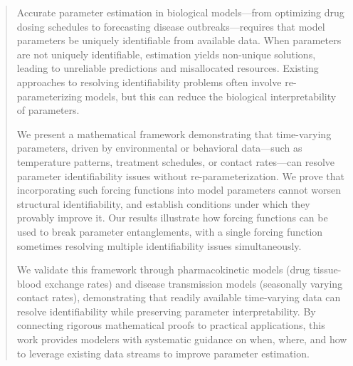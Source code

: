 \documentclass[a4paper,fleqn]{cas-dc}
\theoremstyle{definition}
\begin{document}
\begin{abstract}
    Accurate parameter estimation in biological models---from optimizing drug dosing schedules to forecasting disease outbreaks—requires that model parameters be uniquely identifiable from available data.
    When parameters are not uniquely identifiable, estimation yields non-unique solutions, leading to unreliable predictions and misallocated resources.
    Existing approaches to resolving identifiability problems often involve re-parameterizing models, but this can reduce the biological interpretability of parameters. 

    We present a mathematical framework demonstrating that time-varying parameters, driven by environmental or behavioral data—such as temperature patterns, treatment schedules, or contact rates—can resolve parameter identifiability issues without re-parameterization.
    We prove that incorporating such forcing functions into model parameters cannot worsen structural identifiability, and establish conditions under which they provably improve it.
    Our results illustrate how forcing functions can be used to break parameter entanglements, with a single forcing function sometimes resolving multiple identifiability issues simultaneously.

    We validate this framework through pharmacokinetic models (drug tissue-blood exchange rates) and disease transmission models (seasonally varying contact rates), demonstrating that readily available time-varying data can resolve identifiability while preserving parameter interpretability.
    By connecting rigorous mathematical proofs to practical applications, this work provides modelers with systematic guidance on when, where, and how to leverage existing data streams to improve parameter estimation.
\end{abstract}



%
%
\end{document}
